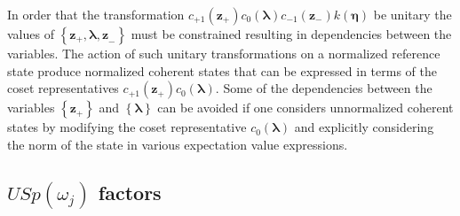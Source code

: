 \documentclass[12pt,aps,amsfonts,amssymb,tightenlines]{revtex4}%
\begin{document}
In order that the transformation $c_{+1}\left(  \mathbf{z}_{+}\right)
c_{0}\left(  \mathbf{\lambda}\right)  c_{-1}\left(  \mathbf{z}_{-}\right)
k\left(  \mathbf{\eta}\right)  $ be unitary the values of $\left\{
\mathbf{z}_{+},\mathbf{\lambda,z}_{-}\right\}  $ must be constrained resulting
in dependencies between the variables. The action of such unitary
transformations on a normalized reference state produce normalized coherent
states that can be expressed in terms of the coset representatives
$c_{+1}\left(  \mathbf{z}_{+}\right)  c_{0}\left(  \mathbf{\lambda}\right)  $.
Some of the dependencies between the variables $\left\{  \mathbf{z}%
_{+}\right\}  $ and $\left\{  \mathbf{\lambda}\right\}  $ can be avoided if
one considers unnormalized coherent states by modifying the coset
representative $c_{0}\left(  \mathbf{\lambda}\right)  $ and explicitly
considering the norm of the state in various expectation value expressions.

\subsection{$USp\left(  \omega_{j}\right)  $ factors}
\end{document}
